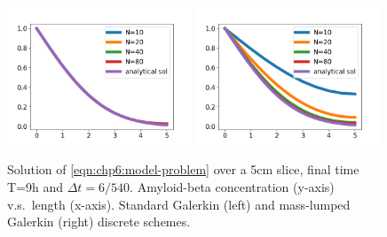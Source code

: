 \begin{figure}	
\includegraphics[width=0.49\textwidth]{./chapters/chp6/FIG/Amyloid_numerical_1D_L_max5_dt300_final32400_lumpednot.png}
\includegraphics[width=0.49\textwidth]{./chapters/chp6/FIG/Amyloid_numerical_1D_L_max5_dt300_final32400_lumpedlumped.png}
\caption{
Solution of \eqref{eqn:chp6:model-problem} over a 5cm slice, final time T=9h and $\Delta t = 6/540$. 
Amyloid-beta concentration (y-axis) v.s.~length (x-axis). Standard Galerkin (left) and mass-lumped 
Galerkin (right) discrete schemes. 
}
\label{fig:chp6:numerics2}
\end{figure}



